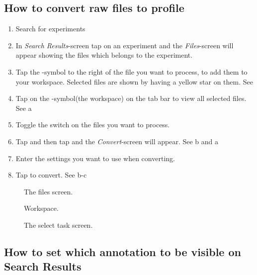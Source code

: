 \subsection{How to convert raw files to profile}


\begin{enumerate}
\item Search for experiments
\item In \emph{Search Results}-screen tap on an experiment and the \emph{Files}-screen will appear showing the files which belongs to the experiment.
\item Tap the -symbol to the right of the file you want to process, to add them to your workspace. Selected files are shown by having a yellow star on them. See 
\item Tap on the -symbol(the workspace) on the tab bar to view all selected files. See a
\item Toggle the switch on the files you want to process.
\item Tap  and then tap  and the \emph{Convert}-screen will appear. See b and a
\item Enter the settings you want to use when converting.
\item Tap  to convert. See b-c
\end{enumerate}

\begin{figure}[htb]
\caption{The files screen.}
\label{fig:ios_files3}
\end{figure}
\FloatBarrier

\begin{figure}[htb]
\caption{Workspace.}
\label{fig:ios_selectedFiles}
\end{figure}
\FloatBarrier

\begin{figure}[htb]
\caption{The select task screen.}
\label{fig:ios_convert}
\end{figure}
\FloatBarrier


\subsection{How to set which annotation to be visible on Search Results}

